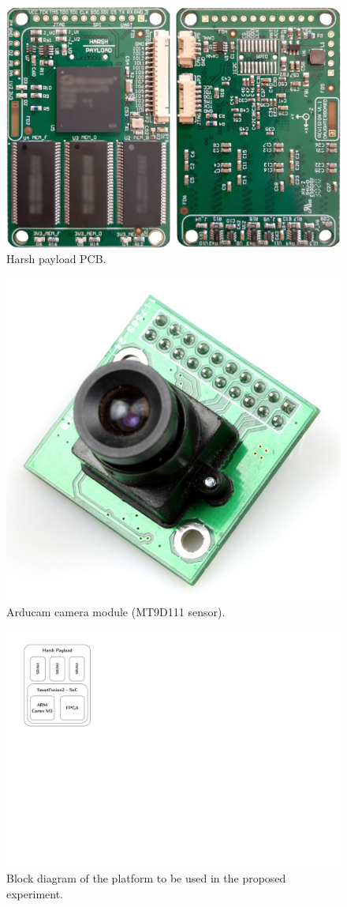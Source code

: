 \begin{figure}[!ht]
    \begin{center}
        \includegraphics[width=0.8\columnwidth]{figures/harsh-payload}
        \caption{Harsh payload PCB.}
        \label{fig:harsh-payload-pcb}
    \end{center}
\end{figure}

\begin{figure}[!ht]
    \begin{center}
        \includegraphics[width=0.5\columnwidth]{figures/mt9d111-m12}
        \caption{Arducam camera module (MT9D111 sensor).}
        \label{fig:mt9d111-module}
    \end{center}
\end{figure}

\begin{figure}[!ht]
    \begin{center}
        \includegraphics[width=0.5\columnwidth]{figures/harsh-block-diagram}
        \caption{Block diagram of the platform to be used in the proposed experiment.}
        \label{fig:experiment-platform-block-diagram}
    \end{center}
\end{figure}


